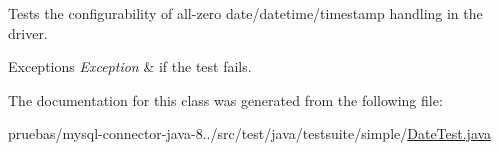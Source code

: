 Tests the configurability of all-\/zero date/datetime/timestamp handling in the driver.


\begin{DoxyExceptions}{Exceptions}
{\em Exception} & if the test fails. \\
\hline
\end{DoxyExceptions}


The documentation for this class was generated from the following file\+:\begin{DoxyCompactItemize}
\item 
pruebas/mysql-\/connector-\/java-\/8../src/test/java/testsuite/simple/\mbox{\hyperlink{_date_test_8java}{Date\+Test.\+java}}\end{DoxyCompactItemize}
